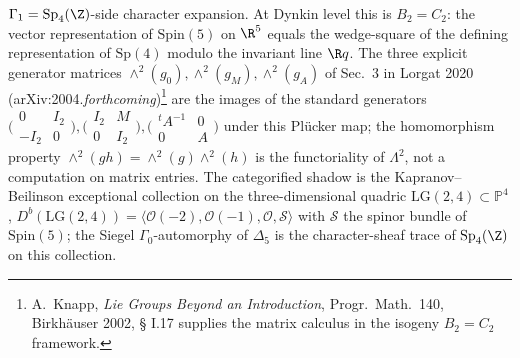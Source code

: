\begin{remark}[Pl\"ucker origin of \texorpdfstring{$\mathrm{Sp}_4(\Z)/\{\pm I_4\}\simeq\mathrm{SO}_+(\Lambda^{3,2})$}{Sp-4(Z)/pm I-4 =SO-+(Lambda-3,2)}]
$\Gamma_1=\mathrm{Sp}_4(\Z)$-side character expansion.
At Dynkin level this is $B_2=C_2$: the vector representation of
$\mathrm{Spin}(5)$ on $\R^5$ equals the wedge-square of the defining
representation of $\mathrm{Sp}(4)$ modulo the invariant line $\R q$.
The three explicit generator matrices $\wedge^2(g_0),\wedge^2(g_M),
\wedge^2(g_A)$ of Sec.~3 in Lorgat 2020
(arXiv:2004.\emph{forthcoming})\footnote{A.~Knapp, \emph{Lie Groups
Beyond an Introduction}, Progr.\ Math.\ 140, Birkh\"auser 2002, \S
I.17 supplies the matrix calculus in the isogeny $B_2=C_2$
framework.} are the images of the standard generators
$\bigl(\begin{smallmatrix}0 & I_2\\-I_2 & 0\end{smallmatrix}\bigr),
\bigl(\begin{smallmatrix}I_2 & M\\0 & I_2\end{smallmatrix}\bigr),
\bigl(\begin{smallmatrix}^tA^{-1} & 0\\0 & A\end{smallmatrix}\bigr)$
under this Pl\"ucker map; the homomorphism property
$\wedge^2(gh)=\wedge^2(g)\wedge^2(h)$ is the functoriality of
$\Lambda^2$, not a computation on matrix entries. The categorified
shadow is the Kapranov--Beilinson exceptional collection on the
three-dimensional quadric $\mathrm{LG}(2,4)\subset\mathbb P^4$,
$D^b(\mathrm{LG}(2,4))=\langle\mathcal O(-2),\mathcal
O(-1),\mathcal O,\mathcal S\rangle$ with $\mathcal S$ the spinor
bundle of $\mathrm{Spin}(5)$; the Siegel $\Gamma_0$-automorphy of
$\Delta_5$ is the character-sheaf trace of $\mathrm{Sp}_4(\Z)$ on
this collection.
\end{remark}

